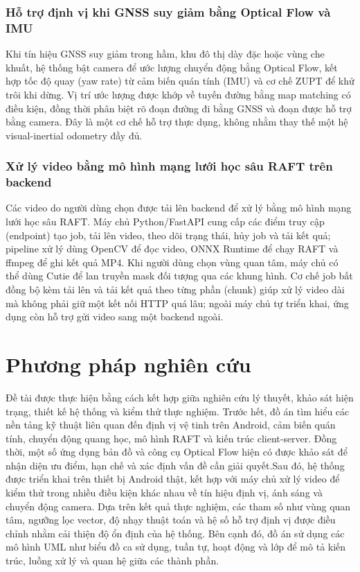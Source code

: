 \documentclass[../DoAn.tex]{subfiles}
\begin{document}
\subsubsection{Hỗ trợ định vị khi GNSS suy giảm bằng Optical Flow và IMU}
Khi tín hiệu GNSS suy giảm trong hầm, khu đô thị dày đặc hoặc vùng che khuất, hệ thống bật camera để ước lượng chuyển động bằng Optical Flow, kết hợp tốc độ quay (yaw rate) từ cảm biến quán tính (IMU) và cơ chế ZUPT để khử trôi khi dừng. Vị trí ước lượng được khớp về tuyến đường bằng map matching có điều kiện, đồng thời phân biệt rõ đoạn đường đi bằng GNSS và đoạn được hỗ trợ bằng camera. Đây là một cơ chế hỗ trợ thực dụng, không nhằm thay thế một hệ visual-inertial odometry đầy đủ.

\subsubsection{Xử lý video bằng mô hình mạng lưới học sâu RAFT trên backend}
Các video do người dùng chọn được tải lên backend để xử lý bằng mô hình mạng lưới học sâu RAFT. Máy chủ Python/FastAPI cung cấp các điểm truy cập (endpoint) tạo job, tải lên video, theo dõi trạng thái, hủy job và tải kết quả; pipeline xử lý dùng OpenCV để đọc video, ONNX Runtime để chạy RAFT và ffmpeg để ghi kết quả MP4. Khi người dùng chọn vùng quan tâm, máy chủ có thể dùng Cutie để lan truyền mask đối tượng qua các khung hình. Cơ chế job bất đồng bộ kèm tải lên và tải kết quả theo từng phần (chunk) giúp xử lý video dài mà không phải giữ một kết nối HTTP quá lâu; ngoài máy chủ tự triển khai, ứng dụng còn hỗ trợ gửi video sang một backend ngoài.

\section{Phương pháp nghiên cứu}
\label{section:1.4}
Đề tài được thực hiện bằng cách kết hợp giữa nghiên cứu lý thuyết, khảo sát hiện trạng, thiết kế hệ thống và kiểm thử thực nghiệm. Trước hết, đồ án tìm hiểu các nền tảng kỹ thuật liên quan đến định vị vệ tinh trên Android, cảm biến quán tính, chuyển động quang học, mô hình RAFT và kiến trúc client-server. Đồng thời, một số ứng dụng bản đồ và công cụ Optical Flow hiện có được khảo sát để nhận diện ưu điểm, hạn chế và xác định vấn đề cần giải quyết.Sau đó, hệ thống được triển khai trên thiết bị Android thật, kết hợp với máy chủ xử lý video để kiểm thử trong nhiều điều kiện khác nhau về tín hiệu định vị, ánh sáng và chuyển động camera. Dựa trên kết quả thực nghiệm, các tham số như vùng quan tâm, ngưỡng lọc vector, độ nhạy thuật toán và hệ số hỗ trợ định vị được điều chỉnh nhằm cải thiện độ ổn định của hệ thống. Bên cạnh đó, đồ án sử dụng các mô hình UML như biểu đồ ca sử dụng, tuần tự, hoạt động và lớp để mô tả kiến trúc, luồng xử lý và quan hệ giữa các thành phần.
\end{document}
